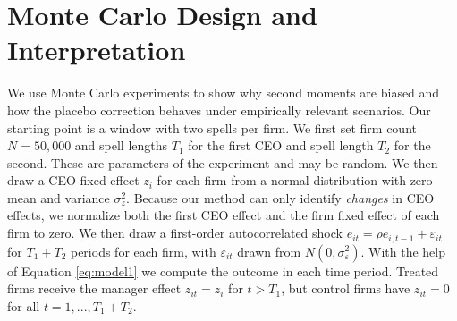 \documentclass[11pt,a4paper]{article}
\begin{document}

\section{Monte Carlo Design and Interpretation}

We use Monte Carlo experiments to show why second moments are biased and how the placebo correction behaves under empirically relevant scenarios. Our starting point is a window with two spells per firm. We first set firm count $N=50,000$ and spell lengths $T_1$ for the first CEO and spell length $T_2$ for the second. These are parameters of the experiment and may be random. We then draw a CEO fixed effect $z_i$ for each firm from a normal distribution with zero mean and variance $\sigma_z^2$. Because our method can only identify \emph{changes} in CEO effects, we normalize both the first CEO effect and the firm fixed effect of each firm to zero. We then draw a first-order autocorrelated shock $e_{it} = \rho e_{i,t-1}+\varepsilon_{it}$ for $T_1+T_2$ periods for each firm, with $\varepsilon_{it}$ drawn from $N(0,\sigma^2_\varepsilon)$. With the help of Equation \eqref{eq:model1} we compute the outcome in each time period. Treated firms receive the manager effect $z_{it}=z_i$ for $t>T_1$, but control firms have $z_{it}=0$ for all $t=1,...,T_1+T_2$. 
\end{document}
